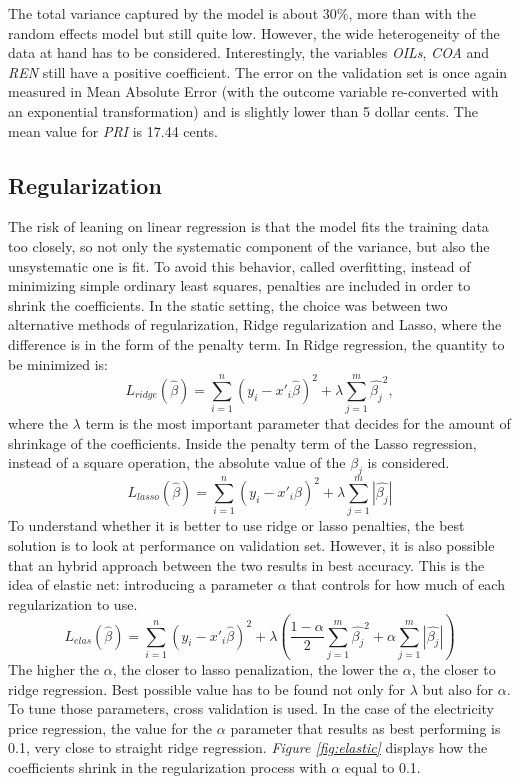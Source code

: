 \documentclass[a4paper,12pt]{book}
\begin{document}
The total variance captured by the model is about 30\%, more than with the random effects model but still quite low. However, the wide heterogeneity of the data at hand has to be considered. Interestingly, the variables \textit{OILs}, \textit{COA} and \textit{REN} still have a positive coefficient. The error on the validation set is once again measured in Mean Absolute Error (with the outcome variable re-converted with an exponential transformation) and is slightly lower than 5 dollar cents. The mean value for \textit{PRI} is 17.44 cents.

\subsection{Regularization}

The risk of leaning on linear regression is that the model fits the training data too closely, so not only the systematic component of the variance, but also the unsystematic one is fit. To avoid this behavior, called overfitting, instead of minimizing simple ordinary least squares, penalties are included in order to shrink the coefficients. In the static setting, the choice was between two alternative methods of regularization, Ridge regularization and Lasso, where the difference is in the form of the penalty term. In Ridge regression, the quantity to be minimized is: $$L_{ridge}(\hat{\beta}) = \sum\limits_{i=1}^{n}(y_i-x'_i\hat{\beta})^2 + \lambda\sum\limits_{j=1}^{m}\hat{\beta_j}^2,$$ where the $\lambda$ term is the most important parameter that decides for the amount of shrinkage of the coefficients. Inside the penalty term of the Lasso regression, instead of a square operation, the absolute value of the $\beta_j$ is considered. $$L_{lasso}(\hat{\beta}) = \sum\limits_{i=1}^{n}(y_i-x'_i\hat{\beta})^2 + \lambda\sum\limits_{j=1}^{m}|\hat{\beta_j}|$$ To understand whether it is better to use ridge or lasso penalties, the best solution is to look at performance on validation set. However, it is also possible that an hybrid approach between the two results in best accuracy. This is the idea of elastic net: introducing a parameter $\alpha$ that controls for how much of each regularization to use. $$L_{elas}(\hat{\beta}) = \sum\limits_{i=1}^{n}(y_i-x'_i\hat{\beta})^2 + \lambda(\frac{1-\alpha}{2}\sum\limits_{j=1}^{m}\hat{\beta_j}^2 + \alpha\sum\limits_{j=1}^{m}|\hat{\beta_j}|)$$ The higher the $\alpha$, the closer to lasso penalization, the lower the $\alpha$, the closer to ridge regression. Best possible value has to be found not only for $\lambda$ but also for $\alpha$. To tune those parameters, cross validation is used. In the case of the electricity price regression, the value for the $\alpha$ parameter that results as best performing is 0.1, very close to straight ridge regression. \textit{Figure \ref{fig:elastic}} displays how the coefficients shrink in the regularization process with $\alpha$ equal to 0.1.
\end{document}
